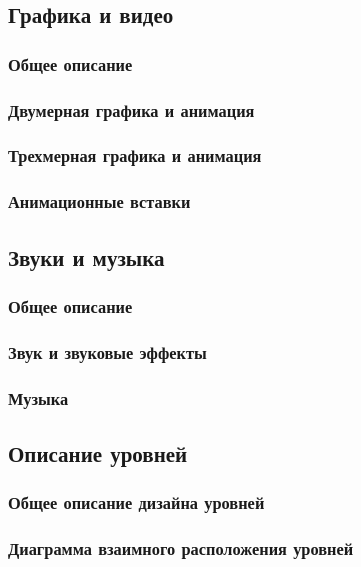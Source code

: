\documentclass{article}
\begin{document}
\begin{itemize}
\subsection{Графика и видео}

\subsubsection{Общее описание}

\subsubsection{Двумерная графика и анимация}

\subsubsection{Трехмерная графика и анимация}

\subsubsection{Анимационные вставки}

\subsection{Звуки и музыка}

\subsubsection{Общее описание}

\subsubsection{Звук и звуковые эффекты}

\subsubsection{Музыка}

\subsection{Описание уровней}

\subsubsection{Общее описание дизайна уровней}

\subsubsection{Диаграмма взаимного расположения уровней}


\end{itemize}
\end{document}
